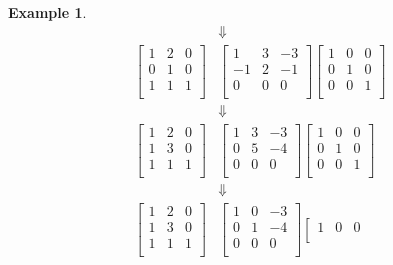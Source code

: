 \documentclass[11pt]{amsart}
\theoremstyle{plain}
\newtheorem{exa}{Example}
\theoremstyle{definition}
\begin{document}
\begin{exa}
\begin{align*}
  &\Downarrow\\
  \left[\begin{array}{rrr}
  1&2&0\\
  0&1&0\\
  1&1&1\\
  \end{array}\right]
  &
  \left[\begin{array}{rrr}
  1&3&-3\\
  -1&2&-1\\
  0&0&0\\
  \end{array}\right]
  \left[\begin{array}{rrr}
  1&0&0\\
  0&1&0\\
  0&0&1\\
  \end{array}\right]\\
  &\Downarrow\\
  \left[\begin{array}{rrr}
  1&2&0\\
  1&3&0\\
  1&1&1\\
  \end{array}\right]
  &
  \left[\begin{array}{rrr}
  1&3&-3\\
  0&5&-4\\
  0&0&0\\
  \end{array}\right]
  \left[\begin{array}{rrr}
  1&0&0\\
  0&1&0\\
  0&0&1\\
  \end{array}\right]\\
  &\Downarrow\\
  \left[\begin{array}{rrr}
  1&2&0\\
  1&3&0\\
  1&1&1\\
  \end{array}\right]
  &
  \left[\begin{array}{rrr}
  1&0&-3\\
  0&1&-4\\
  0&0&0\\
  \end{array}\right]
  \left[\begin{array}{rrr}
  1&0&0\\

\end{array}
\end{align*}
\end{exa}
\end{document}
